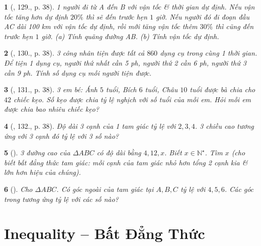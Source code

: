 \documentclass{article}
\newtheorem{baitoan}{}
\begin{document}
\begin{baitoan}[\cite{Binh_Toan_7_tap_1}, 129., p. 38]
	1 người đi từ A đến B với vận tốc \& thời gian dự định. Nếu vận tốc tăng hơn dự định $20\%$ thì sẽ đến trước hẹn $1$ giờ. Nếu người đó đi đoạn đầu AC dài {\rm100 km} với vận tốc dự định, rồi mới tăng vận tốc thêm $30\%$ thì cũng đến trước hẹn $1$ giờ. (a) Tính quãng đường AB. (b) Tính vận tốc dự định.
\end{baitoan}

\begin{baitoan}[\cite{Binh_Toan_7_tap_1}, 130., p. 38]
	3 công nhân tiện được tất cả $860$ dụng cụ trong cùng 1 thời gian. Để tiện 1 dụng cụ, người thứ nhất cần {\rm5 ph}, người thứ 2 cần {\rm6 ph}, người thứ 3 cần {\rm9 ph}. Tính số dụng cụ mỗi người tiện được.
\end{baitoan}

\begin{baitoan}[\cite{Binh_Toan_7_tap_1}, 131., p. 38]
	3 em bé: Ánh $5$ tuổi, Bích $6$ tuổi, Châu $10$ tuổi được bà chia cho $42$ chiếc kẹo. Số kẹo được chia tỷ lệ nghịch với số tuổi của mỗi em. Hỏi mỗi em được chia bao nhiêu chiếc kẹo?
\end{baitoan}

\begin{baitoan}[\cite{Binh_Toan_7_tap_1}, 132., p. 38]
	Độ dài 3 cạnh của 1 tam giác tỷ lệ với $2,3,4$. 3 chiều cao tương ứng với 3 cạnh đó tỷ lệ với 3 số nào?
\end{baitoan}

\begin{baitoan}[\cite{Binh_Toan_7_tap_1}]
	3 đường cao của $\Delta ABC$ có độ dài bằng $4,12,x$. Biết $x\in\mathbb{N}^\star$. Tìm $x$ (cho biết {\rm bất đẳng thức tam giác}: mỗi cạnh của tam giác nhỏ hơn tổng 2 cạnh kia \& lớn hơn hiệu của chúng).
\end{baitoan}

\begin{baitoan}[\cite{Binh_Toan_7_tap_1}]
	Cho $\Delta ABC$. Có góc ngoài của tam giác tại $A,B,C$ tỷ lệ với $4,5,6$. Các góc trong tương ứng tỷ lệ với các số nào?
\end{baitoan}


\section{Inequality -- Bất Đẳng Thức}
\end{document}
